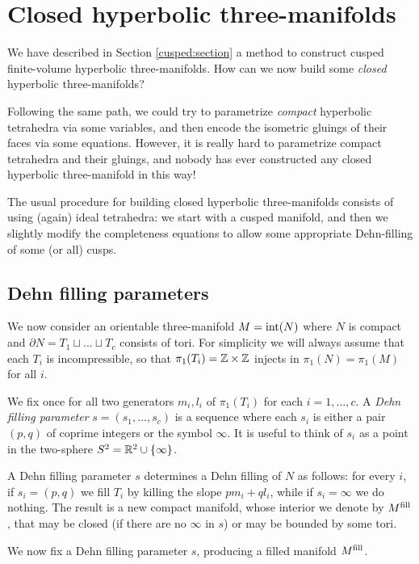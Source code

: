 \section{Closed hyperbolic three-manifolds}
We have described in Section \ref{cusped:section} a method to construct cusped finite-volume hyperbolic three-manifolds. How can we now build some \emph{closed} hyperbolic three-manifolds? 

Following the same path, we could try to parametrize \emph{compact} hyperbolic tetrahedra via some variables, and then encode the isometric gluings of their faces via some equations. However, it is really hard to parametrize compact tetrahedra and their gluings, and nobody has ever constructed any closed hyperbolic three-manifold in this way! 

The usual procedure for building closed hyperbolic three-manifolds consists of using (again) ideal tetrahedra: we start with a cusped manifold, and then we slightly modify the completeness equations to allow some appropriate Dehn-filling of some (or all) cusps. 

\subsection{Dehn filling parameters} \label{DF:parameters:subsection}
We now consider an orientable three-manifold $M = {\rm int}(N)$ where $N$ is compact and $\partial N = T_1 \sqcup \ldots \sqcup T_c$ consists of tori. For simplicity we will always assume that each $T_i$ is incompressible, so that $\pi_1(T_i)=\mathbb{Z}\times \mathbb{Z}$ injects in $\pi_1(N) = \pi_1(M)$ for all $i$. 

We fix once for all two generators $m_i, l_i$ of $\pi_1(T_i)$ for each $i=1,\ldots,c$. A \emph{Dehn filling parameter} $s = (s_1,\ldots, s_c)$ is a sequence where each $s_i$ is either a pair $(p,q)$ of coprime integers or the symbol $\infty$. It is useful to think of $s_i$ as a point in the two-sphere $S^2 = \mathbb{R}^2 \cup \{\infty \}$.

A Dehn filling parameter $s$ determines a Dehn filling of $N$ as follows: for every $i$, if $s_i=(p,q)$ we fill $T_i$ by killing the slope $pm_i + ql_i$, while if $s_i=\infty$ we do nothing. The result is a new compact manifold, whose interior we denote by $M^{\rm fill}$, that may be closed (if there are no $\infty$ in $s$) or may be bounded by some tori.

We now fix a Dehn filling parameter $s$, producing a filled manifold $M^{\rm fill}$.

